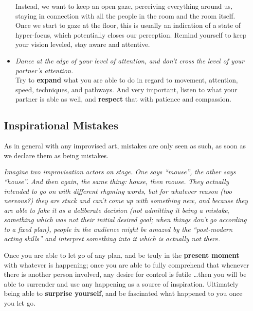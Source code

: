 \begin{itemize}
    Instead, we want to keep an open gaze, perceiving everything around us, staying in connection with all the people in the room and the room itself.
    Once we start to gaze at the floor, this is usually an indication of a state of hyper-focus, which potentially closes our perception.
    Remind yourself to keep your vision leveled, stay aware and attentive.
    \item [] \textit{Dance at the edge of your level of attention, and don't cross the level of your partner's attention.} \\
    Try to \textbf{expand} what you are able to do in regard to movement, attention, speed, techniques, and pathways.
    And very important, listen to what your partner is able as well, and \textbf{respect} that with patience and compassion.
\end{itemize}

\subsection{Inspirational Mistakes}\label{subsec:inspirational-mistakes}

As in general with any improvised art, mistakes are only seen as such, as soon as we declare them as being mistakes.

\begin{displayquote}
    \textit{
Imagine two improvisation actors on stage.
One says ``mouse'', the other says ``house''.
And then again, the same thing: house, then mouse.
They actually intended to go on with different rhyming words, but for whatever reason (too nervous?) they are stuck and can't come up with something new, and because they are able to fake it as a deliberate decision (not admitting it being a mistake, something which was not their initial desired goal; when things don't go according to a fixed plan), people in the audience might be amazed by the ``post-modern acting skills'' and interpret something into it which is actually not there.
    }
\end{displayquote}

Once you are able to let go of any plan, and be truly in the \textbf{present moment} with whatever is happening; once you are able to fully comprehend that whenever there is another person involved, any desire for control is futile \ldots then you will be able to surrender and use any happening as a source of inspiration.
Ultimately being able to \textbf{surprise yourself}, and be fascinated what happened to you once you let go.
